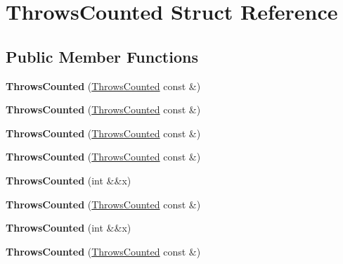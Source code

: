 \hypertarget{struct_throws_counted}{}\section{Throws\+Counted Struct Reference}
\label{struct_throws_counted}
\subsection*{Public Member Functions}
\begin{DoxyCompactItemize}
\item 
\mbox{\label{struct_throws_counted_a6593400149125ecbc3a60281e532d3c1}} 
{\bfseries Throws\+Counted} (\mbox{\hyperlink{struct_throws_counted}{Throws\+Counted}} const \&)
\item 
\mbox{\label{struct_throws_counted_a6593400149125ecbc3a60281e532d3c1}} 
{\bfseries Throws\+Counted} (\mbox{\hyperlink{struct_throws_counted}{Throws\+Counted}} const \&)
\item 
\mbox{\label{struct_throws_counted_a6593400149125ecbc3a60281e532d3c1}} 
{\bfseries Throws\+Counted} (\mbox{\hyperlink{struct_throws_counted}{Throws\+Counted}} const \&)
\item 
\mbox{\label{struct_throws_counted_a6593400149125ecbc3a60281e532d3c1}} 
{\bfseries Throws\+Counted} (\mbox{\hyperlink{struct_throws_counted}{Throws\+Counted}} const \&)
\item 
\mbox{\label{struct_throws_counted_a396eb568fdadf5cde2f7cda6e68db881}} 
{\bfseries Throws\+Counted} (int \&\&x)
\item 
\mbox{\label{struct_throws_counted_a6593400149125ecbc3a60281e532d3c1}} 
{\bfseries Throws\+Counted} (\mbox{\hyperlink{struct_throws_counted}{Throws\+Counted}} const \&)
\item 
\mbox{\label{struct_throws_counted_a396eb568fdadf5cde2f7cda6e68db881}} 
{\bfseries Throws\+Counted} (int \&\&x)
\item 
\mbox{\label{struct_throws_counted_a6593400149125ecbc3a60281e532d3c1}} 
{\bfseries Throws\+Counted} (\mbox{\hyperlink{struct_throws_counted}{Throws\+Counted}} const \&)
\end{DoxyCompactItemize}
